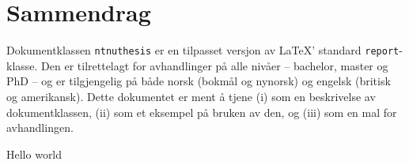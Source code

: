 \chapter*{Sammendrag}

Dokumentklassen \texttt{ntnuthesis} er en tilpasset versjon av \LaTeX' standard \texttt{report}-klasse. Den er tilrettelagt for avhandlinger på alle nivåer – bachelor, master og PhD – og er tilgjengelig på både norsk (bokmål og nynorsk) og engelsk (britisk og amerikansk). Dette dokumentet er ment å tjene (i) som en beskrivelse av dokument\-klassen, (ii) som et eksempel på bruken av den, og (iii) som en mal for avhandlingen.

Hello world

